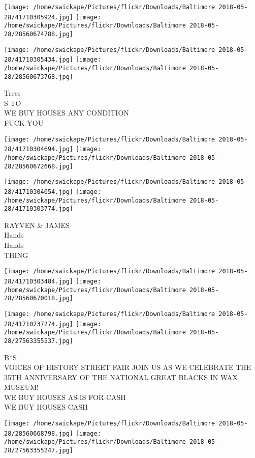 \documentclass[10pt,letterpaper]{article}
\begin{document}
\texttt{[image: /home/swickape/Pictures/flickr/Downloads/Baltimore 2018-05-28/41710305924.jpg]}
\texttt{[image: /home/swickape/Pictures/flickr/Downloads/Baltimore 2018-05-28/28560674788.jpg]}

\texttt{[image: /home/swickape/Pictures/flickr/Downloads/Baltimore 2018-05-28/41710305434.jpg]}
\texttt{[image: /home/swickape/Pictures/flickr/Downloads/Baltimore 2018-05-28/28560673768.jpg]}

Trees\\
S TO\\
WE BUY HOUSES ANY CONDITION\\
FUCK YOU
\pagebreak

\texttt{[image: /home/swickape/Pictures/flickr/Downloads/Baltimore 2018-05-28/41710304694.jpg]}
\texttt{[image: /home/swickape/Pictures/flickr/Downloads/Baltimore 2018-05-28/28560672668.jpg]}

\texttt{[image: /home/swickape/Pictures/flickr/Downloads/Baltimore 2018-05-28/41710304054.jpg]}
\texttt{[image: /home/swickape/Pictures/flickr/Downloads/Baltimore 2018-05-28/41710303774.jpg]}

RAYVEN \& JAMES\\
Hands\\
Hands\\
THING
\pagebreak

\texttt{[image: /home/swickape/Pictures/flickr/Downloads/Baltimore 2018-05-28/41710303484.jpg]}
\texttt{[image: /home/swickape/Pictures/flickr/Downloads/Baltimore 2018-05-28/28560670018.jpg]}

\texttt{[image: /home/swickape/Pictures/flickr/Downloads/Baltimore 2018-05-28/41710237274.jpg]}
\texttt{[image: /home/swickape/Pictures/flickr/Downloads/Baltimore 2018-05-28/27563355537.jpg]}

B*S\\
VOICES OF HISTORY STREET FAIR JOIN US AS WE CELEBRATE THE 35TH ANNIVERSARY OF THE NATIONAL GREAT BLACKS IN WAX MUSEUM!\\
WE BUY HOUSES AS{-}IS FOR CASH\\
WE BUY HOUSES CASH
\pagebreak

\texttt{[image: /home/swickape/Pictures/flickr/Downloads/Baltimore 2018-05-28/28560668798.jpg]}
\texttt{[image: /home/swickape/Pictures/flickr/Downloads/Baltimore 2018-05-28/27563355247.jpg]}
\end{document}
